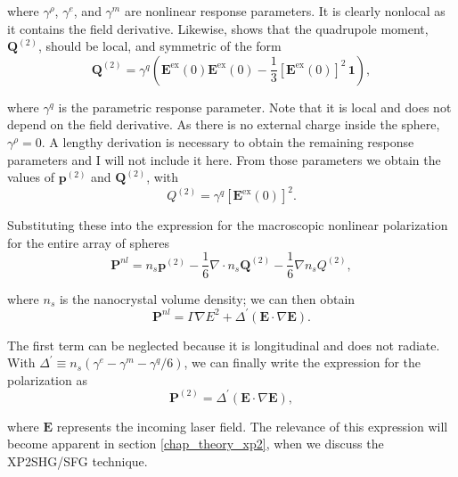 \documentclass[10pt]{article}
\begin{document}
where $\gamma^{\rho}$, $\gamma^{e}$, and $\gamma^{m}$ are nonlinear response parameters. It is clearly nonlocal as it contains the field derivative. Likewise, \cite{brudny2000second} shows that the quadrupole moment, $\mathbf{Q}^{(2)}$, should be local, and symmetric of the form
\begin{equation}
\mathbf{Q}^{(2)} = \gamma^{q}\left(\mathbf{E}^{\text{ex}}(0)\mathbf{E}^{\text{ex}}(0) - \frac{1}{3}[\mathbf{E}^{\text{ex}}(0)]^{2}\,\mathbf{1}\right),
\end{equation}

where $\gamma^{q}$ is the parametric response parameter. Note that it is local and does not depend on the field derivative. As there is no external charge inside the sphere, $\gamma^{\rho} = 0$. A lengthy derivation is necessary to obtain the remaining response parameters and I will not include it here. From those parameters we obtain the values of $\mathbf{p}^{(2)}$ and $\mathbf{Q}^{(2)}$, with
\begin{equation}
Q^{(2)} = \gamma^{q}\left[\mathbf{E}^{\text{ex}}(0)\right]^{2}.
\end{equation}

Substituting these into the expression for the macroscopic nonlinear polarization for the entire array of spheres
\begin{equation}
\mathbf{P}^{nl} = n_{s}\mathbf{p}^{(2)} - \frac{1}{6}\nabla\cdot n_{s}\mathbf{Q}^{(2)} - \frac{1}{6}\nabla n_{s}Q^{(2)},
\end{equation}

where $n_{s}$ is the nanocrystal volume density; we can then obtain
\begin{equation}
\mathbf{P}^{nl} = \Gamma\nabla E^{2} + \Delta^{\prime}\left(\mathbf{E}\cdot\nabla\mathbf{E}\right).
\end{equation}

The first term can be neglected because it is longitudinal and does not radiate. With $\Delta^{'}\equiv n_{s}\left(\gamma^{e} - \gamma^{m} - \gamma^{q}/6\right)$, we can finally write the expression for the polarization as
\begin{equation}
\mathbf{P}^{(2)} = \Delta^{\prime}\left(\mathbf{E}\cdot\nabla\mathbf{E}\right),\label{eq_mochan_p}
\end{equation}

where $\mathbf{E}$ represents the incoming laser field. The relevance of this expression will become apparent in section \ref{chap_theory_xp2}, when we discuss the XP2SHG/SFG technique.
\end{document}
